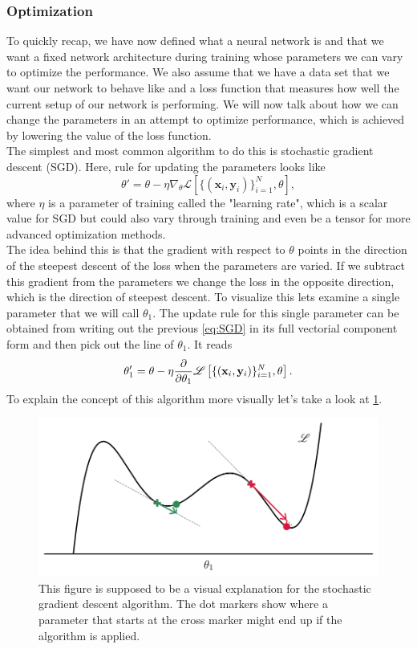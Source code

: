 \subsubsection{Optimization}
To quickly recap, we have now defined what a neural network is and that we want a fixed network architecture during training whose parameters we can vary to optimize the performance. We also assume that we have a data set that we want our network to behave like and a loss function that measures how well the current setup of our network is performing. We will now talk about how we can change the parameters in an attempt to optimize performance, which is achieved by lowering the value of the loss function.\\
The simplest and most common algorithm to do this is stochastic gradient descent (SGD). Here, rule for updating the parameters looks like 
\begin{equation}\label{eq:SGD}
	\theta' = \theta - \eta \nabla_\theta \mathscr{L}\left[ \{(\mathbf{x}_i, \mathbf{y}_i)\}_{i=1}^{N}, \theta \right],
\end{equation}
where $\eta$ is a parameter of training called the "learning rate", which is a scalar value for SGD but could also vary through training and even be a tensor for more advanced optimization methods.\\
The idea behind this is that the gradient with respect to $\theta$ points in the direction of the steepest descent of the loss when the parameters are varied. If we subtract this gradient from the parameters we change the loss in the opposite direction, which is the direction of steepest descent. To visualize this lets examine a single parameter that we will call $\theta_1$. The update rule for this single parameter can be obtained from writing out the previous \cref{eq:SGD} in its full vectorial component form and then pick out the line of $\theta_1$. It reads
\begin{equation}
	\theta_1' = \theta - \eta \frac{\partial}{\partial\theta_1} \mathscr{L}\left[ \{(\mathbf{x}_i, \mathbf{y}_i)\}_{i=1}^{N}, \theta \right].
\end{equation}
To explain the concept of this algorithm more visually let's take a look at \cref{fig:sgd_explanation_plot}. 
\begin{figure}
	\centering
	\includegraphics[width = 14cm]{text/MachineLearningBasics/plots/sgd_plot.pdf}
	\caption{This figure is supposed to be a visual explanation for the stochastic gradient descent algorithm. The dot markers show where a parameter that starts at the cross marker might end up if the algorithm is applied.}
	\label{fig:sgd_explanation_plot}
\end{figure}
